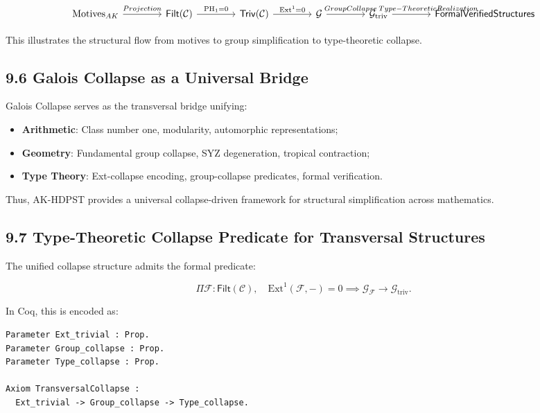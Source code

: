 \documentclass[11pt]{article}
\begin{document}
\[
\begin{tikzcd}[column sep=4em]
\mathrm{Motives}_{AK} \arrow[r, "Projection"]
& \mathsf{Filt}(\mathcal{C}) \arrow[r, "\mathrm{PH}_1 = 0"]
& \mathsf{Triv}(\mathcal{C}) \arrow[r, "\mathrm{Ext}^1 = 0"]
& \mathcal{G} \arrow[r, "\hspace{1em}Group Collapse"]
& \mathcal{G}_{\mathrm{triv}} \arrow[r, "\hspace{3.5em}Type-Theoretic Realization"]
& \mathsf{Formal Verified Structures}
\end{tikzcd}
\]


This illustrates the structural flow from motives to group simplification to type-theoretic collapse.

\subsection*{9.6 Galois Collapse as a Universal Bridge}

Galois Collapse serves as the transversal bridge unifying:

\begin{itemize}
    \item \textbf{Arithmetic}: Class number one, modularity, automorphic representations;
    \item \textbf{Geometry}: Fundamental group collapse, SYZ degeneration, tropical contraction;
    \item \textbf{Type Theory}: Ext-collapse encoding, group-collapse predicates, formal verification.
\end{itemize}

Thus, AK-HDPST provides a universal collapse-driven framework for structural simplification across mathematics.

\subsection*{9.7 Type-Theoretic Collapse Predicate for Transversal Structures}

The unified collapse structure admits the formal predicate:

\[
\Pi \mathcal{F} : \mathsf{Filt}(\mathcal{C}), \quad \mathrm{Ext}^1(\mathcal{F}, -) = 0 \implies \mathcal{G}_{\mathcal{F}} \longrightarrow \mathcal{G}_{\mathrm{triv}}.
\]

In Coq, this is encoded as:

\begin{lstlisting}[language=Coq]
Parameter Ext_trivial : Prop.
Parameter Group_collapse : Prop.
Parameter Type_collapse : Prop.

Axiom TransversalCollapse :
  Ext_trivial -> Group_collapse -> Type_collapse.
\end{lstlisting}
\end{document}
